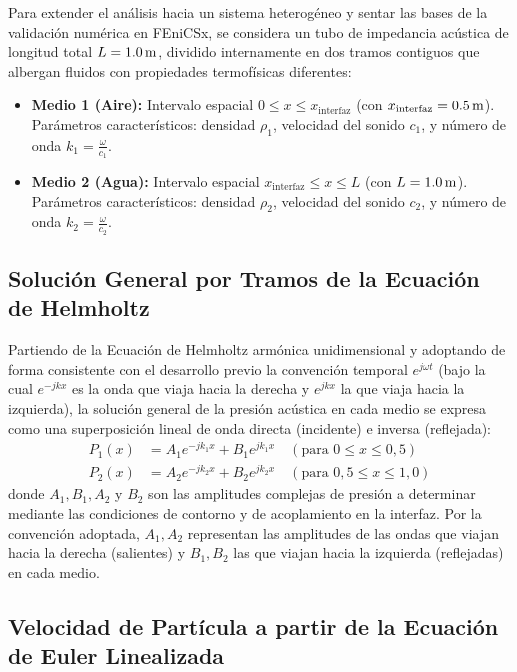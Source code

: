 \documentclass[11pt,letterpaper]{article}
\begin{document}
Para extender el análisis hacia un sistema heterogéneo y sentar las bases de la validación numérica en FEniCSx, se considera un tubo de impedancia acústica de longitud total $L = \text{\qty{1,0}{\metre}}$, dividido internamente en dos tramos contiguos que albergan fluidos con propiedades termofísicas diferentes:
\begin{itemize}
    \item \textbf{Medio 1 (Aire):} Intervalo espacial $0 \le x \le x_{\text{interfaz}}$ (con $x_{\text{interfaz}} = \text{\qty{0,5}{\metre}}$). Parámetros característicos: densidad $\rho_1$, velocidad del sonido $c_1$, y número de onda $k_1 = \frac{\omega}{c_1}$.
    \item \textbf{Medio 2 (Agua):} Intervalo espacial $x_{\text{interfaz}} \le x \le L$ (con $L = \text{\qty{1,0}{\metre}}$). Parámetros característicos: densidad $\rho_2$, velocidad del sonido $c_2$, y número de onda $k_2 = \frac{\omega}{c_2}$.
\end{itemize}

\subsection{Solución General por Tramos de la Ecuación de Helmholtz}

Partiendo de la Ecuación de Helmholtz armónica unidimensional y adoptando de forma consistente con el desarrollo previo la convención temporal $e^{j\omega t}$ (bajo la cual $e^{-jkx}$ es la onda que viaja hacia la derecha y $e^{jkx}$ la que viaja hacia la izquierda), la solución general de la presión acústica en cada medio se expresa como una superposición lineal de onda directa (incidente) e inversa (reflejada):
\begin{align}
    P_1(x) &= A_1 e^{-j k_1 x} + B_1 e^{j k_1 x} \quad (\text{para } 0 \le x \le 0{,}5) \\
    P_2(x) &= A_2 e^{-j k_2 x} + B_2 e^{j k_2 x} \quad (\text{para } 0{,}5 \le x \le 1{,}0)
\end{align}
donde $A_1, B_1, A_2$ y $B_2$ son las amplitudes complejas de presión a determinar mediante las condiciones de contorno y de acoplamiento en la interfaz. Por la convención adoptada, $A_1, A_2$ representan las amplitudes de las ondas que viajan hacia la derecha (salientes) y $B_1, B_2$ las que viajan hacia la izquierda (reflejadas) en cada medio.

\subsection{Velocidad de Partícula a partir de la Ecuación de Euler Linealizada}
\end{document}
